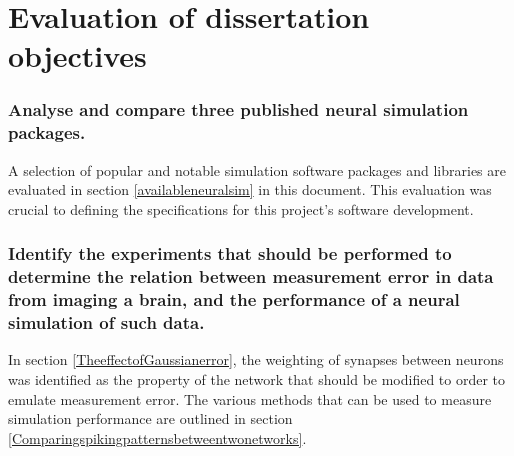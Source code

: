 
\newpage

\section{Evaluation of dissertation objectives}

\subsubsection{Analyse and compare three published neural simulation packages.}
A selection of popular and notable simulation software packages and libraries are evaluated in section \ref{availableneuralsim} in this document. This evaluation was crucial to defining the specifications for this project's software development.


\subsubsection{Identify the experiments that should be performed to determine
      the relation between measurement error in data from imaging a brain, and
      the performance of a neural simulation of such data.}
In section \ref{TheeffectofGaussianerror}, the weighting of synapses between neurons was identified as the property of the network that should be modified to order to emulate measurement error. The various methods that can be used to measure simulation performance are outlined in section \ref{Comparingspikingpatternsbetweentwonetworks}.

